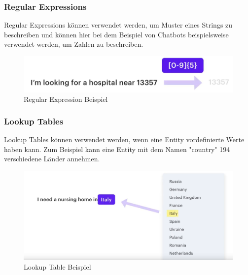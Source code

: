 \subsubsection{Regular Expressions}

Regular Expressions können verwendet werden, um Muster eines Strings zu beschreiben und können hier bei dem Beispiel von Chatbots beispielsweise verwendet werden, um Zahlen zu beschreiben.\cite{rasaMasterclassRegexFeaturizer, pipelineComponentsYoutube, regexFeaturizerCrf}

\begin{figure}[hbt!]
  \centering
  \includegraphics[scale=0.5]{pics/regular-expression-example}
  \caption{Regular Expression Beispiel~\cite{pipelineComponentsYoutube}}
  \label{fig:Regular Expression Beispiel}
\end{figure}

\subsubsection{Lookup Tables}

Lookup Tables können verwendet werden, wenn eine Entity vordefinierte Werte haben kann.
Zum Beispiel kann eine Entity mit dem Namen "country" 194 verschiedene Länder annehmen.\cite{rasaMasterclassRegexFeaturizer, pipelineComponentsYoutube, regexFeaturizerCrf}

\begin{figure}[hbt!]
  \centering
  \includegraphics[scale=0.25]{pics/lookup-table-example}
  \caption{Lookup Table Beispiel~\cite{pipelineComponentsYoutube}}
  \label{fig:Lookup Table Beispiel}
\end{figure}

